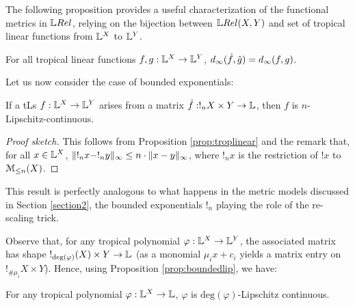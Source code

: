The following proposition provides a useful characterization of the functional metrics in $\LREL$, relying on 
the bijection between $\HOM{\LREL}{X}{Y}$ and set of tropical linear functions from $\mathbb{L}^{X}$ to $\mathbb{L}^{Y}$.

\begin{proposition}
For all tropical linear functions $f,g:\mathbb{L}^{X}\to \mathbb{L}^{Y}$, $d_{\infty}(\hat{f},\hat{g})=d_\infty(f,g)$.%
\end{proposition}

Let us now consider the case of bounded exponentials:
\begin{proposition}\label{prop:boundedlip}
If a tLs $f: \mathbb{L}^{X}\to \mathbb{L}^{Y}$ arises from a matrix $\hat{f}:!_{n}X\times Y\to \mathbb{L}$, then $f$ is $n$-Lipschitz-continuous.
\end{proposition}
\begin{proof}[Proof sketch]
This follows from Proposition \ref{prop:troplinear} and the remark that, for all $x\in \mathbb{L}^{X}$, $\lVert !_{n} x-!_{n} y\rVert_{\infty}\leq n\cdot \lVert x- y\rVert_{\infty}$, where $!_{n} x$ is the restriction of $! x$ to $\mathcal{M}_{\leq n}(X)$.%
\end{proof}
This result is perfectly analogous to what happens in the metric models discussed in Section \ref{section2}, the bounded exponentials $!_{n}$ playing the role of the re-scaling trick.

Observe that, for any tropical polynomial $\varphi:\mathbb{L}^{X}\to \mathbb{L}^{Y}$, the associated matrix has shape $!_{\mathrm{deg}(\varphi)}(X)\times Y\to \mathbb{L}$ (as a monomial $\mu_ix+c_{i}$ yields a matrix entry on $!_{\#\mu_i}X\times Y$). Hence, using Proposition \ref{prop:boundedlip}, we have:
\begin{corollary}\label{prop:polylip}
For any tropical polynomial $\varphi:\mathbb{L}^{X}\to\mathbb{L}$, $\varphi$ is $\mathrm{deg}(\varphi)$-Lipschitz continuous.
\end{corollary}

